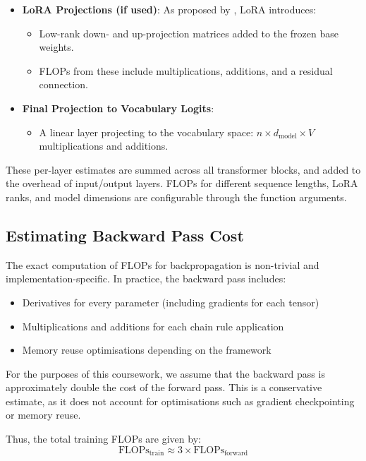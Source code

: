 \documentclass[a4paper,12pt]{article}
\begin{document}
\begin{itemize}
  \item \textbf{LoRA Projections (if used)}: As proposed by \citet{hu2021lora}, LoRA introduces:
  \begin{itemize}
    \item Low-rank down- and up-projection matrices added to the frozen base weights.
    \item FLOPs from these include multiplications, additions, and a residual connection.
  \end{itemize}

  \item \textbf{Final Projection to Vocabulary Logits}:
  \begin{itemize}
    \item A linear layer projecting to the vocabulary space: $n \times d_{\text{model}} \times V$ multiplications and additions.
  \end{itemize}
\end{itemize}

These per-layer estimates are summed across all transformer blocks, and added to the overhead of input/output layers. FLOPs for different sequence lengths, LoRA ranks, and model dimensions are configurable through the function arguments.

\subsection*{Estimating Backward Pass Cost}

The exact computation of FLOPs for backpropagation is non-trivial and implementation-specific. In practice, the backward pass includes:

\begin{itemize}
  \item Derivatives for every parameter (including gradients for each tensor)
  \item Multiplications and additions for each chain rule application
  \item Memory reuse optimisations depending on the framework
\end{itemize}

For the purposes of this coursework, we assume that the backward pass is approximately double the cost of the forward pass. This is a conservative estimate, as it does not account for optimisations such as gradient checkpointing or memory reuse.


Thus, the total training FLOPs are given by:
\begin{equation}
\text{FLOPs}_{\text{train}} \approx 3 \times \text{FLOPs}_{\text{forward}}
\end{equation}
\end{document}
